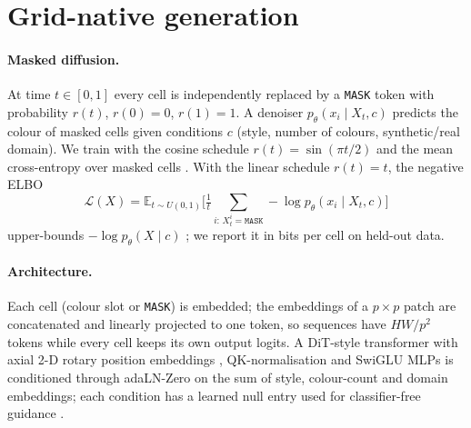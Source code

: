 \documentclass[11pt]{article}
\begin{document}
\section{Grid-native generation}
\label{sec:model}

\paragraph{Masked diffusion.}
At time $t\in[0,1]$ every cell is independently replaced by a \texttt{MASK} token with probability
$r(t)$, $r(0)=0$, $r(1)=1$. A denoiser $p_\theta(x_i \mid X_t, c)$ predicts the colour of masked cells
given conditions $c$ (style, number of colours, synthetic/real domain). We train with the cosine
schedule $r(t)=\sin(\pi t/2)$ and the mean cross-entropy over masked cells \cite{chang2022maskgit}.
With the linear schedule $r(t)=t$, the negative ELBO
\begin{equation}
\mathcal{L}(X) = \mathbb{E}_{t\sim U(0,1)}\Big[\tfrac{1}{t}\sum_{i:\,X_t^i=\texttt{MASK}} -\log p_\theta(x_i\mid X_t,c)\Big]
\end{equation}
upper-bounds $-\log p_\theta(X\mid c)$ \cite{sahoo2024simple,shi2024simplified}; we report it in
bits per cell on held-out data.

\paragraph{Architecture.}
Each cell (colour slot or \texttt{MASK}) is embedded; the embeddings of a $p\times p$ patch are
concatenated and linearly projected to one token, so sequences have $HW/p^2$ tokens while every
cell keeps its own output logits. A DiT-style transformer \cite{peebles2023scalable,vaswani2017attention}
with axial 2-D rotary position embeddings \cite{su2024roformer}, QK-normalisation and SwiGLU MLPs
is conditioned through adaLN-Zero on the sum of style, colour-count and domain embeddings; each
condition has a learned null entry used for classifier-free guidance \cite{ho2022classifier}.
\end{document}
